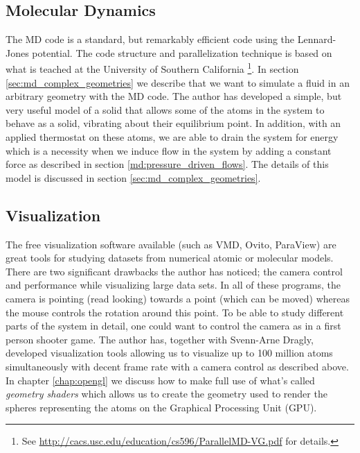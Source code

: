 \subsection{Molecular Dynamics}
The MD code is a standard, but remarkably efficient code using the Lennard-Jones potential. The code structure and parallelization technique is based on what is teached at the University of Southern California \footnote{See \url{http://cacs.usc.edu/education/cs596/ParallelMD-VG.pdf} for details.}. In section \ref{sec:md_complex_geometries} we describe that we want to simulate a fluid in an arbitrary geometry with the MD code. The author has developed a simple, but very useful model of a solid that allows some of the atoms in the system to behave as a solid, vibrating about their equilibrium point. In addition, with an applied thermostat on these atoms, we are able to drain the system for energy which is a necessity when we induce flow in the system by adding a constant force as described in section \ref{md:pressure_driven_flows}. The details of this model is discussed in section \ref{sec:md_complex_geometries}.
\subsection{Visualization}
The free visualization software available (such as VMD, Ovito, ParaView) are great tools for studying datasets from numerical atomic or molecular models. There are two significant drawbacks the author has noticed; the camera control and performance while visualizing large data sets. In all of these programs, the camera is pointing (read looking) towards a point (which can be moved) whereas the mouse controls the rotation around this point. To be able to study different parts of the system in detail, one could want to control the camera as in a first person shooter game. The author has, together with Svenn-Arne Dragly, developed visualization tools allowing us to visualize up to 100 million atoms simultaneously with decent frame rate with a camera control as described above. In chapter \ref{chap:opengl} we discuss how to make full use of what's called \textit{geometry shaders} which allows us to create the geometry used to render the spheres representing the atoms on the Graphical Processing Unit (GPU).